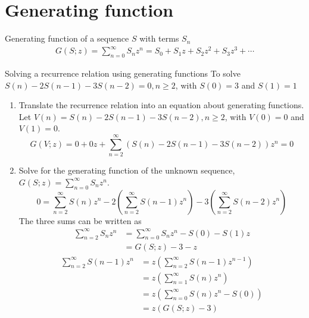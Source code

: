 \documentclass{article}
\begin{document}
\section{Generating function}

Generating function of a sequence $S$ with terms $S_n$
\begin{gather*}
    G(S;z) = \sum_{n=0}^{\infty} S_n z^n = S_0+S_1 z+S_2 z^2+S_3 z^3+\cdots
\end{gather*}

Solving a recurrence relation using generating functions
To solve $S(n) - 2S(n-1) - 3S(n-2) = 0, n \geq 2$, with $S(0) = 3$ and $S(1) = 1$
\begin{enumerate}
    \item Translate the recurrence relation into an equation about generating functions. \\
        Let $V(n) = S(n) - 2S (n - 1) - 3S (n - 2), n \geq 2$, with $V(0) = 0$ and $V(1) = 0$.
        \begin{equation*}
        G(V;z) = 0 + 0z +\sum_{n=2}^{\infty}  (S(n) - 2S (n - 1) - 3S (n - 2)) z^n= 0
        \end{equation*}
    \item Solve for the generating function of the unknown sequence, \\
    $G(S;z) = \sum_{n=0}^{\infty} S_n z^n$.
    \begin{equation*}
        0 =\sum_{n=2}^{\infty} {S(n) z^n-2} \left(\sum_{n=2}^{\infty} S(n-1) z^n\right)-3\left(\sum_{n=2}^{\infty} S(n-2) z^n\right)
    \end{equation*}
    The three sums can be written as
    \begin{equation*}
        \begin{split}
            \sum_{n=2}^{\infty} S_n z^n &=\sum_{n=0}^{\infty} S_n z^n - S(0)-S(1)z\\
            &= G(S;z)-3-z
        \end{split}
    \end{equation*}
    \begin{equation*}
        \begin{split}
            \sum_{n=2}^{\infty} S(n-1) z^n &=z\left(\sum_{n=2}^{\infty} S(n-1) z^{n-1}\right)\\
            & =z\left(\sum_{n=1}^{\infty} S(n) z^n\right)\\
            & = z\left(\sum_{n=0}^{\infty} S(n) z^n-S(0)\right)\\
            &= z(G(S;z)-3)
        \end{split}

\end{equation*}
\end{enumerate}
\end{document}
